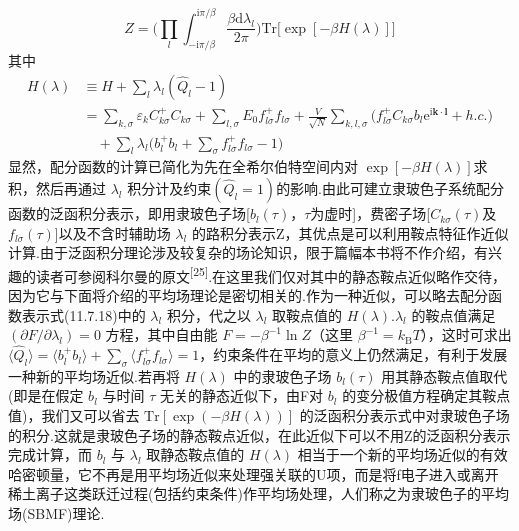 \begin{equation}
  Z=\biggl(\prod_{l}\int_{-\mathrm{i}\pi/\beta}^{\mathrm{i}\pi/\beta}\frac{\beta\mathrm{d}\lambda_{l}}{2\pi}\biggr)
  \mathrm{Tr}\bigl[\exp[-\beta H(\lambda)]\bigr]
\end{equation}
其中
\begin{equation}
\begin{aligned}
  H(\lambda)&\equiv H+\sum_{l}\lambda_{l}(\hat{Q}_{l}-1)\\
  &=\sum_{k,\sigma}\varepsilon_{k}C_{k\sigma}^{+}C_{k\sigma}+\sum_{l,\sigma}E_{0}f_{l\sigma}^{+}f_{l\sigma}
  +\frac{V}{\sqrt{N}}\sum_{k,l,\sigma}\bigl(f_{l\sigma}^{+}C_{k\sigma}b_{l}\mathrm{e}^{\mathrm{i}\boldsymbol{k}\cdot\boldsymbol{l}}+h.c.\bigr)\\
  &\quad+\sum_{l}\lambda_{l}\biggl(b_{l}^{+}b_{l}+\sum_{\sigma}f_{l\sigma}^{+}f_{l\sigma}-1\biggr)
\end{aligned}
\end{equation}
显然，配分函数的计算已简化为先在全希尔伯特空间内对 $\exp[-\beta H(\lambda)]$求积，然后再通过 $\lambda_{l}$ 积分计及约束$(\hat{Q}_{l}=1)$的影响.由此可建立隶玻色子系统配分函数的泛函积分表示，即用隶玻色子场[$b_{l}(\tau)$，$\tau$为虚时]，费密子场[$C_{k\sigma}(\tau)$及 $f_{l\sigma}(\tau)$]以及不含时辅助场 $\lambda_{l}$ 的路积分表示Z，其优点是可以利用鞍点特征作近似计算.由于泛函积分理论涉及较复杂的场论知识，限于篇幅本书将不作介绍，有兴趣的读者可参阅科尔曼的原文\textsuperscript{[25]}.在这里我们仅对其中的静态鞍点近似略作交待，因为它与下面将介绍的平均场理论是密切相关的.作为一种近似，可以略去配分函数表示式(11.7.18)中的 $\lambda_{l}$ 积分，代之以 $\lambda_{l}$ 取鞍点值的 $H(\lambda)$.$\lambda_{l}$ 的鞍点值满足 $(\partial F/\partial\lambda_{l})=0$ 方程，其中自由能 $F=-\beta^{-1}\ln Z$（这里 $\beta^{-1}=k_{\mathrm{B}}T$），这时可求出 $\langle\hat{Q}_{l}\rangle=\langle b_{l}^{+}b_{l}\rangle+\sum_{\sigma}\langle f_{l\sigma}^{+}f_{l\sigma}\rangle=1$，约束条件在平均的意义上仍然满足，有利于发展一种新的平均场近似.若再将 $H(\lambda)$ 中的隶玻色子场 $b_{l}(\tau)$ 用其静态鞍点值取代(即是在假定 $b_{l}$ 与时间 $\tau$ 无关的静态近似下，由F对 $b_{l}$ 的变分极值方程确定其鞍点值)，我们又可以省去 $\mathrm{Tr}[\exp(-\beta H(\lambda))]$ 的泛函积分表示式中对隶玻色子场的积分.这就是隶玻色子场的静态鞍点近似，在此近似下可以不用Z的泛函积分表示完成计算，而 $b_{l}$ 与 $\lambda_{l}$ 取静态鞍点值的 $H(\lambda)$ 相当于一个新的平均场近似的有效哈密顿量，它不再是用平均场近似来处理强关联的U项，而是将f电子进入或离开稀土离子这类跃迁过程(包括约束条件)作平均场处理，人们称之为隶玻色子的平均场(SBMF)理论.

